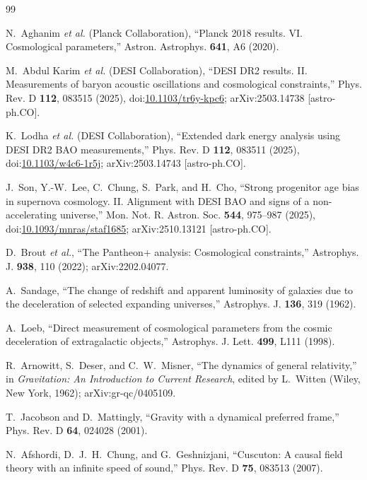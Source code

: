 \documentclass[aps,prd,reprint,nofootinbib,superscriptaddress,longbibliography]{revtex4-2}
\begin{document}
\begin{thebibliography}{99}

N.~Aghanim \emph{et al.} (Planck Collaboration), ``Planck 2018 results. VI. Cosmological parameters,'' Astron. Astrophys. \textbf{641}, A6 (2020).

M.~Abdul Karim \emph{et al.} (DESI Collaboration), ``DESI DR2 results. II. Measurements of baryon acoustic oscillations and cosmological constraints,'' Phys. Rev. D \textbf{112}, 083515 (2025), doi:\href{https://doi.org/10.1103/tr6y-kpc6}{10.1103/tr6y-kpc6}; arXiv:2503.14738 [astro-ph.CO].

K.~Lodha \emph{et al.} (DESI Collaboration), ``Extended dark energy analysis using DESI DR2 BAO measurements,'' Phys. Rev. D \textbf{112}, 083511 (2025), doi:\href{https://doi.org/10.1103/w4c6-1r5j}{10.1103/w4c6-1r5j}; arXiv:2503.14743 [astro-ph.CO].

J.~Son, Y.-W.~Lee, C.~Chung, S.~Park, and H.~Cho, ``Strong progenitor age bias in supernova cosmology. II. Alignment with DESI BAO and signs of a non-accelerating universe,'' Mon. Not. R. Astron. Soc. \textbf{544}, 975--987 (2025), doi:\href{https://doi.org/10.1093/mnras/staf1685}{10.1093/mnras/staf1685}; arXiv:2510.13121 [astro-ph.CO].

D.~Brout \emph{et al.}, ``The Pantheon+ analysis: Cosmological constraints,'' Astrophys. J. \textbf{938}, 110 (2022); arXiv:2202.04077.

A.~Sandage, ``The change of redshift and apparent luminosity of galaxies due to the deceleration of selected expanding universes,'' Astrophys. J. \textbf{136}, 319 (1962).

A.~Loeb, ``Direct measurement of cosmological parameters from the cosmic deceleration of extragalactic objects,'' Astrophys. J. Lett. \textbf{499}, L111 (1998).

R.~Arnowitt, S.~Deser, and C.~W.~Misner, ``The dynamics of general relativity,'' in \emph{Gravitation: An Introduction to Current Research}, edited by L.~Witten (Wiley, New York, 1962); arXiv:gr-qc/0405109.

T.~Jacobson and D.~Mattingly, ``Gravity with a dynamical preferred frame,'' Phys. Rev. D \textbf{64}, 024028 (2001).

N.~Afshordi, D.~J.~H.~Chung, and G.~Geshnizjani, ``Cuscuton: A causal field theory with an infinite speed of sound,'' Phys. Rev. D \textbf{75}, 083513 (2007).


\end{thebibliography}
\end{document}
